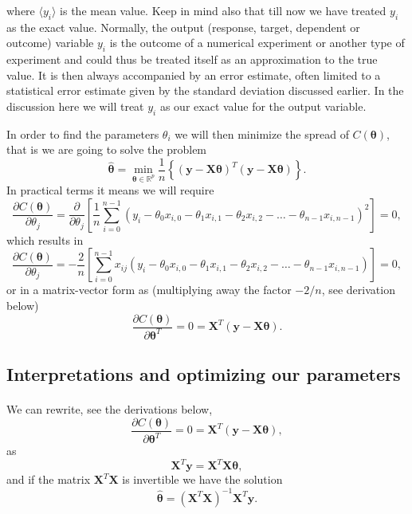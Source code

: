 \documentclass[%
oneside,                 %
final,                   %
10pt]{article}
\begin{document}
where $\langle y_i \rangle$ is the mean value. Keep in mind also that
till now we have treated $y_i$ as the exact value. Normally, the
output (response, target, dependent or outcome) variable $y_i$ is the outcome of a
numerical experiment or another type of experiment and could thus be treated itself as an
approximation to the true value. It is then always accompanied by an
error estimate, often limited to a statistical error estimate given by
the standard deviation discussed earlier. In the discussion here we
will treat $y_i$ as our exact value for the output variable.

In order to find the parameters $\theta_i$ we will then minimize the spread of $C(\bm{\theta})$, that is we are going to solve the problem
\[
\hat{\bm{\theta}}={\displaystyle \min_{\bm{\theta}\in
{\mathbb{R}}^{p}}}\frac{1}{n}\left\{\left(\bm{y}-\bm{X}\bm{\theta}\right)^T\left(\bm{y}-\bm{X}\bm{\theta}\right)\right\}.
\]
In practical terms it means we will require
\[
\frac{\partial C(\bm{\theta})}{\partial \theta_j} = \frac{\partial }{\partial \theta_j}\left[ \frac{1}{n}\sum_{i=0}^{n-1}\left(y_i-\theta_0x_{i,0}-\theta_1x_{i,1}-\theta_2x_{i,2}-\dots-\theta_{n-1}x_{i,n-1}\right)^2\right]=0, 
\]
which results in
\[
\frac{\partial C(\bm{\theta})}{\partial \theta_j} = -\frac{2}{n}\left[ \sum_{i=0}^{n-1}x_{ij}\left(y_i-\theta_0x_{i,0}-\theta_1x_{i,1}-\theta_2x_{i,2}-\dots-\theta_{n-1}x_{i,n-1}\right)\right]=0, 
\]
or in a matrix-vector form as (multiplying away the factor $-2/n$, see derivation below)
\[
\frac{\partial C(\bm{\theta})}{\partial \bm{\theta}^T} = 0 = \bm{X}^T\left( \bm{y}-\bm{X}\bm{\theta}\right).  
\]

\subsection{Interpretations and optimizing our parameters}

\paragraph{}
We can rewrite, see the derivations below, 
\[
\frac{\partial C(\bm{\theta})}{\partial \bm{\theta}^T} = 0 = \bm{X}^T\left( \bm{y}-\bm{X}\bm{\theta}\right),  
\]
as
\[
\bm{X}^T\bm{y} = \bm{X}^T\bm{X}\bm{\theta},  
\]
and if the matrix $\bm{X}^T\bm{X}$ is invertible we have the solution
\[
\hat{\bm{\theta}} =\left(\bm{X}^T\bm{X}\right)^{-1}\bm{X}^T\bm{y}.
\]
\end{document}
